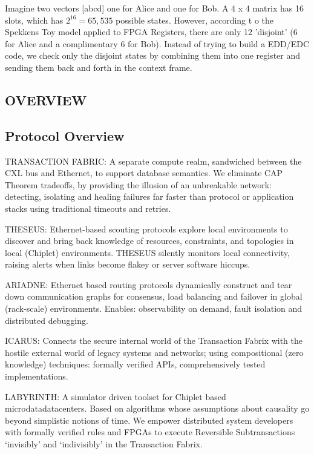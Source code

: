 \documentclass[../../../OAE-SPEC-MAIN.tex]{subfiles}
\begin{document}
Imagine two vectors [abcd] one for Alice and one for Bob. A 4 x 4 matrix has 16 slots, which has $2^{16} = 65,535$ possible states. However, according t o the Spekkens Toy model applied to FPGA Registers, there are only 12 'disjoint' (6 for Alice and a complimentary 6 for Bob). Instead of trying to build a EDD/EDC code, we check only the disjoint states by combining them into one register and sending them back and forth in the context frame.



\subsection{OVERVIEW}

\subsection{Protocol Overview}
\begin{description}
\item TRANSACTION FABRIC: A separate compute realm, sandwiched between the CXL bus and Ethernet, to support database semantics. We eliminate CAP Theorem tradeoffs, by providing the illusion of an unbreakable network: detecting, isolating and healing failures far faster than protocol or application stacks using traditional timeouts and retries.

\item THESEUS: Ethernet-based scouting protocols explore local environments to discover and bring back knowledge of resources, constraints, and topologies in local (Chiplet) environments. THESEUS silently monitors local connectivity, raising alerts when links become flakey or server software hiccups.

\item ARIADNE: Ethernet based routing protocols dynamically construct and tear down communication graphs for consensus, load balancing and failover in global (rack-scale) environments. Enables: observability on demand, fault isolation and distributed debugging.

\item ICARUS: Connects the secure internal world of the Transaction Fabrix with the hostile external world of legacy systems and networks; using compositional (zero knowledge) techniques: formally verified APIs, comprehensively tested implementations.

\item LABYRINTH: A simulator driven toolset for Chiplet based microdatadatacenters. Based on algorithms whose assumptions about causality go beyond simplistic notions of time. We empower distributed system developers with formally verified rules and FPGAs to execute Reversible Subtransactions ‘invisibly’ and ‘indivisibly’ in the Transaction Fabrix. 

\end{description}
\end{document}
